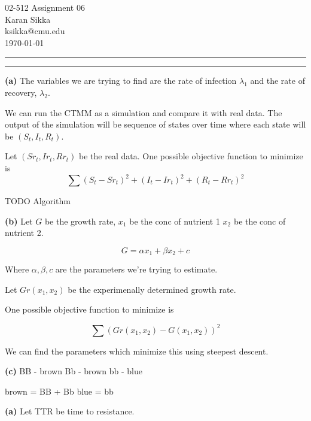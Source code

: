 \documentclass[11pt,letterpaper]{article}
\makeatletter
\newcommand{\question}[1] {\vspace{.25in} \hrule\vspace{0.5em}
\noindent{\bf #1} \vspace{0.5em}
\hrule \vspace{.10in}}
\renewcommand{\part}[1] {\vspace{.10in} {\bf (#1)}}
\newcommand{\myname}{Karan Sikka}
\newcommand{\myandrew}{ksikka@cmu.edu}
\newcommand{\myhwnum}{06}
\makeatother
\begin{document}
\medskip

\thispagestyle{plain}
\begin{center}                  %
{\Large 02-512 Assignment \myhwnum} \\
\myname \\
\myandrew \\
\today
\end{center}

\question{1}
\part{a}
The variables we are trying to find are 
the rate of infection $\lambda_1$
and the rate of recovery, $\lambda_2$.

We can run the CTMM as a simulation
and compare it with real data.
The output of the simulation will be sequence of states over time
where each state will be $(S_t,I_t,R_t)$.

Let $(Sr_t, Ir_t, Rr_t)$ be the real data.
One possible objective function to minimize is 
$$ \sum (S_t - Sr_t)^2 + (I_t - Ir_t)^2 + (R_t - Rr_t)^2 $$

TODO Algorithm

\part{b}
Let $G$ be the growth rate,
$x_1$ be the conc of nutrient 1
$x_2$ be the conc of nutrient 2.

$$G = \alpha x_1 + \beta x_2 + c$$

Where $\alpha, \beta, c$ are the parameters we're trying to estimate.

Let $Gr(x_1,x_2)$ be the experimenally determined growth rate.

One possible objective function to minimize is

$$ \sum (Gr(x_1, x_2) - G(x_1, x_2))^2 $$

We can find the parameters which minimize this using
steepest descent.

\part{c}
BB - brown
Bb - brown
bb - blue

 brown = BB + Bb
 blue = bb


\part{a}
Let TTR be time to resistance.
\end{document}
